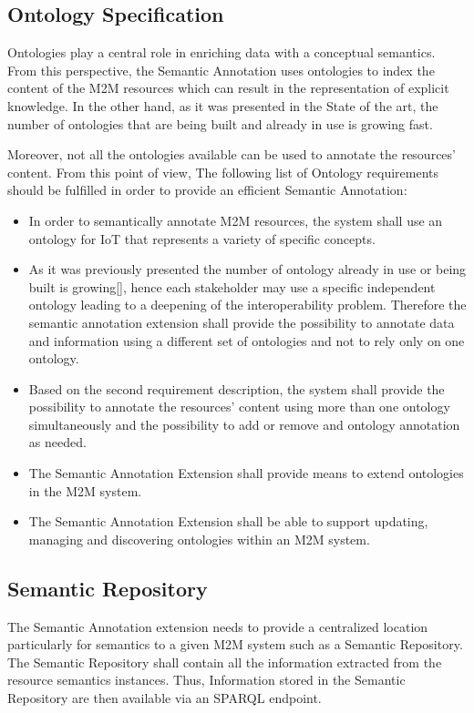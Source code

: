 \subsection{Ontology Specification}
Ontologies play a central role in enriching data with a conceptual semantics. From this perspective, the Semantic Annotation uses ontologies to index the content of the M2M resources which can result in the representation of explicit knowledge. In the other hand, as it was presented in the State of the art, the number of ontologies that are being built and already in use is growing fast. \par 
Moreover, not all the ontologies available can be used to annotate the resources' content. From this point of view, The following list of Ontology requirements should be fulfilled in order to provide an efficient Semantic Annotation:
\begin{itemize}
\item In order to semantically annotate M2M resources, the system shall use an ontology for IoT that represents a variety of specific concepts.
\item As it was previously presented the number of ontology already in use or being built is growing[], hence each stakeholder may use a specific independent ontology leading to a deepening of the interoperability problem. Therefore the semantic annotation extension shall provide the possibility to annotate data and information using a different set of ontologies and not to rely only on one ontology.
\item Based on the second requirement description, the system shall provide the possibility to annotate the resources' content using more than one ontology simultaneously and the possibility to add or remove and ontology annotation as needed.
\item The Semantic Annotation Extension shall provide means to extend ontologies in the M2M system.
\item The Semantic Annotation Extension shall be able to support updating, managing and discovering ontologies within an M2M system.
\end{itemize}

\subsection{Semantic Repository}

The Semantic Annotation extension needs to provide a centralized location particularly for semantics to a given M2M system such as a Semantic Repository. The Semantic Repository shall contain all the information extracted from the resource semantics instances. Thus, Information stored in the Semantic Repository are then available via an SPARQL endpoint.

